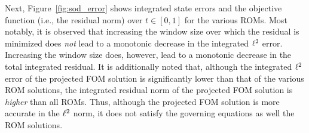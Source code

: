 Next, Figure~\ref{fig:sod_error} shows integrated state errors and the objective function (i.e., the residual norm) over $t \in [0,1]$ for the various  ROMs. Most notably, it is observed 
that increasing the window size over which the residual is minimized does \textit{not} lead to a monotonic decrease in the integrated $\ell^2$  
error. Increasing the window size does, however, lead to a monotonic decrease in the total integrated residual. It is additionally noted that, although the integrated
$\ell^2$ error of 
the projected FOM solution is significantly lower than that of the various ROM solutions, the integrated residual norm of the projected FOM solution is \textit{higher} 
than all ROMs. Thus, although the projected FOM solution is more accurate in the $\ell^2$ norm, it does not satisfy the governing equations as well the ROM solutions. 

